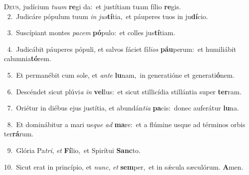 \lettrine{\initial\textcolor{\initialcolor}{D}}{eus,} judícium \textit{tu}\-\textit{um} \textbf{re}\-gi da:~\star et justítiam tuam fílio \textbf{re}\-gis.\\
{\numbfont\textcolor{\numbcolor}{~2.}}~Judicáre pópulum tuum \textit{in} \textit{jus}\-\textbf{tí}tia,~\star et páuperes tuos in ju\-\textbf{dí}\-cio.\par
{\numbfont\textcolor{\numbcolor}{~3.}}~Suscípiant montes \textit{pa}\-\textit{cem} \textbf{pó}\-pulo:~\star et colles jus\-\textbf{tí}\-tiam.\par
{\numbfont\textcolor{\numbcolor}{~4.}}~Judicábit páuperes pópuli, et salvos fáciet fí\-\textit{li}\-\textit{os} \textbf{páu}\-perum:~\star et humiliábit calumnia\-\textbf{tó}\-rem.\par
{\numbfont\textcolor{\numbcolor}{~5.}}~Et permanébit cum sole, et \textit{an}\-\textit{te} \textbf{lu}\-nam,~\star in generatióne et generati\-\textbf{ó}\-nem.\par
{\numbfont\textcolor{\numbcolor}{~6.}}~Descéndet sicut plúvi\textit{a} \textit{in} \textbf{vel}\-lus:~\star et sicut stillicídia stillántia super \textbf{ter}\-ram.\par
{\numbfont\textcolor{\numbcolor}{~7.}}~Oriétur in diébus ejus justítia, et abundán\-\textit{ti}\-\textit{a} \textbf{pa}\-cis:~\star donec auferátur \textbf{lu}\-na.\par
{\numbfont\textcolor{\numbcolor}{~8.}}~Et dominábitur a mari us\textit{que} \textit{ad} \textbf{ma}\-re:~\star et a flúmine usque ad términos orbis ter\-\textbf{rá}\-rum.\par
{\numbfont\textcolor{\numbcolor}{~9.}}~Glória Pa\-\textit{tri}\-, \textit{et} \textbf{Fí}\-lio,~\star et Spirítui \textbf{Sanc}\-to.\par
{\numbfont\textcolor{\numbcolor}{10.}}~Sicut erat in princípio, et \textit{nunc}\-, \textit{et} \textbf{sem}\-per,~\star et in sǽcula sæculórum. \textbf{A}\-men.\par
